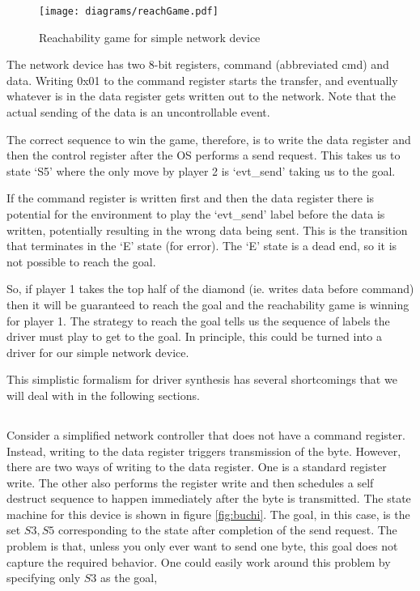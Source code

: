 \begin{figure}[t]
\centering
\texttt{[image: diagrams/reachGame.pdf]}
\caption{Reachability game for simple network device}
\label{fig:reach}
\end{figure}

The network device has two 8-bit registers, command (abbreviated cmd) and data. Writing 0x01 to the command register starts the transfer, and eventually whatever is in the data register gets written out to the network. Note that the actual sending of the data is an uncontrollable event. 

The correct sequence to win the game, therefore, is to write the data register and then the control register after the OS performs a send request. This takes us to state `S5' where the only move by player 2 is `evt\_send' taking us to the goal. 

If the command register is written first and then the data register there is potential for the environment to play the `evt\_send' label before the data is written, potentially resulting in the wrong data being sent. This is the transition that terminates in the `E' state (for error). The `E' state is a dead end, so it is not possible to reach the goal. 

So, if player 1 takes the top half of the diamond (ie. writes data before command) then it will be guaranteed to reach the goal and the reachability game is winning for player 1. The strategy to reach the goal tells us the sequence of labels the driver must play to get to the goal. In principle, this could be turned into a driver for our simple network device.

This simplistic formalism for driver synthesis has several shortcomings that we will deal with in the following sections.

\subsection{\buchi}

Consider a simplified network controller that does not have a command register. Instead, writing to the data register triggers transmission of the byte. However, there are two ways of writing to the data register. One is a standard register write. The other also performs the register write and then schedules a self destruct sequence to happen immediately after the byte is transmitted. The state machine for this device is shown in figure \ref{fig:buchi}. The goal, in this case, is the set ${S3, S5}$ corresponding to the state after completion of the send request. The problem is that, unless you only ever want to send one byte, this goal does not capture the required behavior. One could easily work around this problem by specifying only ${S3}$ as the goal, 

